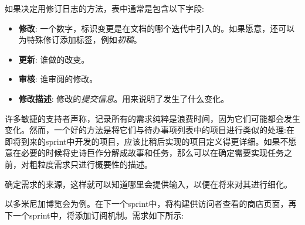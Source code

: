 如果决定用修订日志的方法，表中通常是包含以下字段:

\begin{itemize}
\item 
\textbf{修改}: 一个数字，标识变更是在文档的哪个迭代中引入的。如果愿意，还可以为特殊修订添加标签，例如\textit{初稿}。

\item 
\textbf{更新}: 谁做的改变。

\item 
\textbf{审核}: 谁审阅的修改。

\item
\textbf{修改描述}: 修改的\textit{提交信息}。用来说明了发生了什么变化。
\end{itemize}


许多敏捷的支持者声称，记录所有的需求纯粹是浪费时间，因为它们可能都会发生变化。然而，一个好的方法是将它们与待办事项列表中的项目进行类似的处理:在即将到来的sprint中开发的项目，应该比稍后实现的项目定义得更详细。如果不愿意在必要的时候将史诗巨作分解成故事和任务，那么可以在确定需要实现任务之前，对粗粒度需求只进行概要性的描述。

\begin{tcolorbox}[colback=webgreen!5!white,colframe=webgreen!75!black, title=TIP]
\hspace*{0.7cm}确定需求的来源，这样就可以知道哪里会提供输入，以便在将来对其进行细化。
\end{tcolorbox}

以多米尼加博览会为例。在下一个sprint中，将构建供访问者查看的商店页面，再下一个sprint中，将添加订阅机制。需求如下所示:

